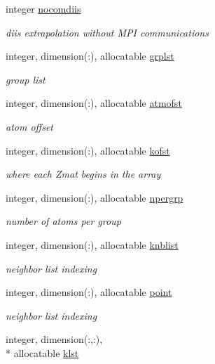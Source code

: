 \begin{DoxyCompactItemize}
integer \hyperlink{classdivcon_adc6683167f9989d9804a65ec3cac7909}{nocomdiis}
\begin{DoxyCompactList}\small\item\em diis extrapolation without M\-P\-I communications \end{DoxyCompactList}\item 
integer, dimension(\-:), allocatable \hyperlink{classdivcon_a3a01a2319abc05a8446408112da13898}{grplst}
\begin{DoxyCompactList}\small\item\em group list \end{DoxyCompactList}\item 
integer, dimension(\-:), allocatable \hyperlink{classdivcon_afe6c08bc2376eec7662edfe9cc98de07}{atmofst}
\begin{DoxyCompactList}\small\item\em atom offset \end{DoxyCompactList}\item 
integer, dimension(\-:), allocatable \hyperlink{classdivcon_a323999e4a5bd8e8ea2d277eb52ee66ad}{kofst}
\begin{DoxyCompactList}\small\item\em where each Zmat begins in the array \end{DoxyCompactList}\item 
integer, dimension(\-:), allocatable \hyperlink{classdivcon_aaec5fcd38debfd444315b3f4eaaf901c}{npergrp}
\begin{DoxyCompactList}\small\item\em number of atoms per group \end{DoxyCompactList}\item 
integer, dimension(\-:), allocatable \hyperlink{classdivcon_a946b1a91ab9c1ee815dbbc9f5773677a}{knblist}
\begin{DoxyCompactList}\small\item\em neighbor list indexing \end{DoxyCompactList}\item 
integer, dimension(\-:), allocatable \hyperlink{classdivcon_af984aacb47c91db0642bacadd4a7369b}{point}
\begin{DoxyCompactList}\small\item\em neighbor list indexing \end{DoxyCompactList}\item 
integer, dimension(\-:,\-:), \\*
allocatable \hyperlink{classdivcon_ab2af8e112e7ff97134538cc3c57a932e}{klst}

\end{DoxyCompactItemize}
